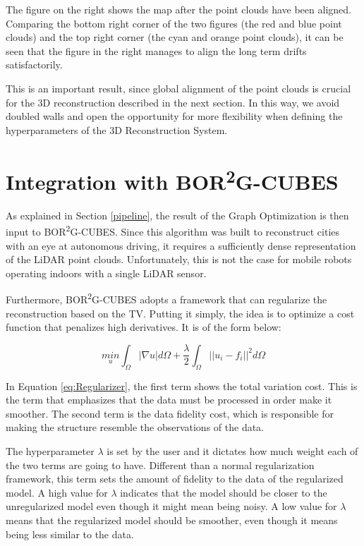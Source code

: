 \documentclass[11pt]{article}
\begin{document}
The figure on the right shows the map after the point clouds have been aligned. Comparing the bottom right corner of the two figures (the red and blue point clouds) and the top right corner (the cyan and orange point clouds), it can be seen that the figure in the right manages to align the long term drifts satisfactorily.
	
This is an important result, since global alignment of the point clouds is crucial for the 3D reconstruction described in the next section. In this way, we avoid doubled walls and open the opportunity for more flexibility when defining the hyperparameters of the 3D Reconstruction System.
	
	\newpage
	\section{Integration with BOR\textsuperscript{2}G-CUBES}
	\label{sec:Borg}
	
As explained in Section \ref{pipeline}, the result of the Graph Optimization is then input to BOR\textsuperscript{2}G-CUBES. Since this algorithm was built to reconstruct cities with an eye at autonomous driving, it requires a sufficiently dense representation of the LiDAR point clouds. Unfortunately, this is not the case for mobile robots operating indoors with a single LiDAR sensor.
	
Furthermore, BOR\textsuperscript{2}G-CUBES adopts a framework that can regularize the reconstruction based on the TV. Putting it simply, the idea is to optimize a cost function that penalizes high derivatives. It is of the form below:


\begin{equation}
\underset{u}{min} \int_{\Omega } | \nabla u| d \Omega + \frac{\lambda}{2} \int_{\Omega}||u_i - f_i||^2 d \Omega
\label{eq:Regularizer}
\end{equation}

In Equation \ref{eq:Regularizer}, the first term shows the total variation cost. This is the term that emphasizes that the data must be processed in order make it smoother. The second term is the data fidelity cost, which is responsible for making the structure resemble the observations of the data.

The hyperparameter $\lambda$ is set by the user and it dictates how much weight each of the two terms are going to have. Different than a normal regularization framework, this term sets the amount of fidelity to the data of the regularized model. A high value for $\lambda$ indicates that the model should be closer to the unregularized model even though it might mean being noisy. A low value for $\lambda$ means that the regularized model should be smoother, even though it means being less similar to the data.
\end{document}
